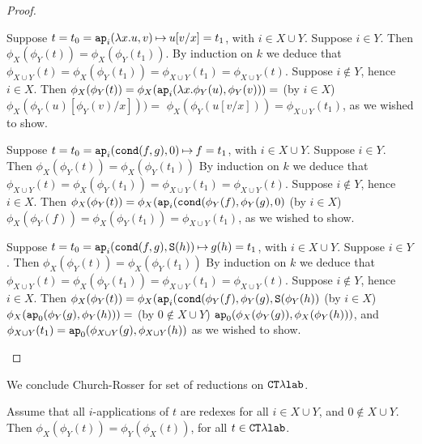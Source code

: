 \begin{proof}
\begin{enumerate}
\begin{enumerate}
Suppose $t = t_0 = {\tt ap}_i(\lambda x.u,v) \mathbin{\mapsto} u[v/x] = t_1$, 
with $i \in X \cup Y$. Suppose $i \in Y$. Then 
$\phi_X(\phi_Y(t)) = \phi_X(\phi_Y(t_1))$. 
By induction on $k$ we deduce that
$\phi_{X \cup Y}(t) = \phi_X(\phi_Y(t_1)) = \phi_{X \cup Y}(t_1) = \phi_{X \cup Y}(t)$.
Suppose $i \not \in Y$, hence $i \in X$. Then 
$\phi_X(\phi_Y(t)) = \phi_X({\tt ap}_i(  \lambda x.\phi_Y(u),  \phi_Y(v)  )) = $
(by $i \in X$) 
$\phi_X( \phi_Y(u)[\phi_Y(v)/x]  )) =$
$\phi_X( \phi_Y(u[v/x])  ) = \phi_{X \cup Y}(t_1)$, 
as we wished to show.

Suppose $t = t_0 = {\tt ap}_i({\tt cond}(f,g),0) \mathbin{\mapsto} f = t_1$, 
with $i \in X \cup Y$. Suppose $i \in Y$. Then $\phi_X(\phi_Y(t)) = \phi_X(\phi_Y(t_1))$
By induction on $k$ we deduce that
$\phi_{X \cup Y}(t) = \phi_X(\phi_Y(t_1)) = \phi_{X \cup Y}(t_1) = \phi_{X \cup Y}(t)$.
Suppose $i \not \in Y$, hence $i \in X$. Then 
$ \phi_X(\phi_Y(t)) = \phi_X({\tt ap}_i( {\tt cond}(\phi_Y(f), \phi_Y(g) , 0) $ 
(by $i \in X$) 
$\phi_X(\phi_Y(f)) = \phi_X(\phi_Y(t_1)) = \phi_{X \cup Y}(t_1)$, 
as we wished to show.

Suppose $t = t_0 = {\tt ap}_i({\tt cond}(f,g),{\tt S}(h)) \mathbin{\mapsto} g(h) = t_1$, 
with $i \in X \cup Y$. Suppose $i \in Y$. Then $\phi_X(\phi_Y(t)) = \phi_X(\phi_Y(t_1))$
By induction on $k$ we deduce that
$\phi_{X \cup Y}(t) = \phi_X(\phi_Y(t_1)) = \phi_{X \cup Y}(t_1) = \phi_{X \cup Y}(t)$.
Suppose $i \not \in Y$, hence $i \in X$. Then 
$ \phi_X(\phi_Y(t)) = \phi_X({\tt ap}_i( {\tt cond}(\phi_Y(f), \phi_Y(g) , {\tt S}(\phi_Y(h)) $ (by $i \in X$) 
$\phi_X({\tt ap}_0(\phi_Y(g), \phi_Y(h) ) ) = $ (by $0 \not \in X \cup Y$)
${\tt ap}_0(\phi_X(\phi_Y(g)), \phi_X(\phi_Y(h)) )$,
and  
$\phi_{X \cup Y}(t_1) = {\tt ap}_0( \phi_{X \cup Y}(g), \phi_{X \cup Y}(h) )$
as we wished to show.



\end{enumerate}

\end{enumerate}
\end{proof}


We conclude Church-Rosser for set of reductions on ${{ {\tt CT}\lambda}\mbox{\tt lab}}$.

\begin{lemma}
Assume that all $i$-applications of $t$ are redexes for all $i \in X \cup Y$,
and $0 \not \in X \cup Y$.
Then $\phi_{X}(\phi_{Y}(t)) =\phi_{Y}(\phi_{X}(t))$, for all $t \in { { {\tt CT}\lambda} \mbox{\tt lab}}$.
\end{lemma}

